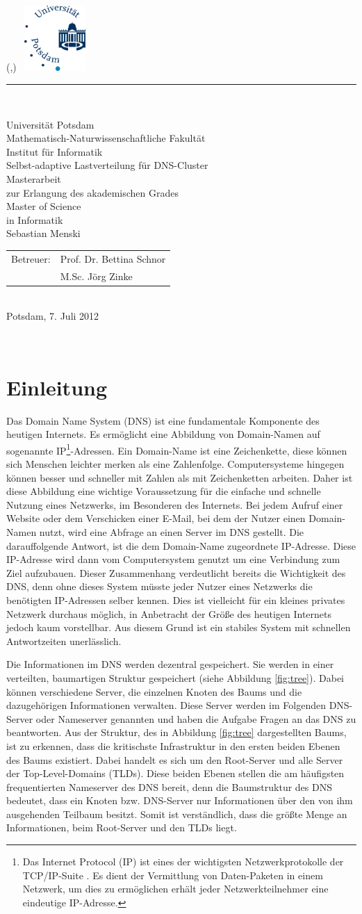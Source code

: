 \documentclass[a4paper, 12pt, BCOR10mm, DIV12, toc=bibliography, toc=listof, german]{scrbook}
\newlength{\TitleMargin}
\newlength{\TitleWidth}
\newcommand{\TitleUni}{Universität Potsdam}
\newcommand{\TitleInstitut}{Mathematisch-Naturwissenschaftliche Fakultät\\Institut für Informatik}
\newcommand{\TitleTitel}{Selbst-adaptive Lastverteilung für DNS-Cluster}
\newcommand{\TitleTyp}{Masterarbeit}
\newcommand{\TitleAutor}{Sebastian Menski}
\newcommand{\TitleBetreuerText}{Betreuer}
\newcommand{\TitleBetreuer}{Prof. Dr. Bettina Schnor\\ &M.Sc. Jörg Zinke}
\newcommand{\TitleAbschlussText}{zur Erlangung des akademischen Grades\\Master of Science\\in Informatik}
\newcommand{\TitleOrt}{Potsdam}
\newcommand{\TitleDatum}{7. Juli 2012}
\renewcommand{\maketitle}{
	\thispagestyle{empty}
	\begin{textblock*}{\TitleWidth}(\TitleMargin,\TitleMargin)
		~\hfill\includegraphics[height=2.5cm]{images/uni-logo}\\[3mm]
		{\color{uniblue}\rule{\TitleWidth}{1mm}}\\[5mm]
		{
			\centering
			\sffamily\Large
			{\LARGE\TitleUni}\\[0.5\baselineskip]
			{\large\TitleInstitut}\\[5\baselineskip]
			{\Huge\TitleTitel}\\[3\baselineskip]

			{\TitleTyp}\\
			\TitleAbschlussText\\[3\baselineskip]

			\TitleAutor\\[3\baselineskip]
			\begin{tabular}{rl}
				\TitleBetreuerText: & \TitleBetreuer
			\end{tabular}\\[2\baselineskip]
			\TitleOrt, \TitleDatum\par
		}
	\end{textblock*}
	~\clearpage
}
\def \dns {Domain Name System (DNS)}
\begin{document}
	\frontmatter
	\maketitle{}
	\tableofcontents{}

	\onehalfspacing{}
	\mainmatter
	\pagestyle{scrheadings}

	\chapter{Einleitung} %
	\label{cha:einleitung}

		Das \dns{} \cite{rfc1034, rfc1035} ist eine fundamentale Komponente des heutigen Internets.  Es
		ermöglicht eine Abbildung von Domain-Namen auf sogenannte IP\footnote{Das Internet Protocol (IP)
		\cite{rfc791} ist eines der wichtigsten Netzwerkprotokolle der TCP/IP-Suite
		\cite{stevens1994}. Es dient der Vermittlung von Daten-Paketen in einem Netzwerk, um dies zu
		ermöglichen erhält jeder Netzwerkteilnehmer eine eindeutige IP-Adresse.}-Adressen. Ein
		Domain-Name ist eine Zeichenkette, diese können sich Menschen leichter merken als eine
		Zahlenfolge.  Computersysteme hingegen können besser und schneller mit Zahlen als mit
		Zeichenketten arbeiten.  Daher ist diese Abbildung eine wichtige Voraussetzung für die einfache
		und schnelle Nutzung eines Netzwerks, im Besonderen des Internets. Bei jedem Aufruf einer
		Website oder dem Verschicken einer E-Mail, bei dem der Nutzer einen Domain-Namen nutzt, wird
		eine Abfrage an einen Server im DNS gestellt. Die darauffolgende Antwort, ist die dem
		Domain-Name zugeordnete IP-Adresse. Diese IP-Adresse wird dann vom Computersystem genutzt um
		eine Verbindung zum Ziel aufzubauen. Dieser Zusammenhang verdeutlicht bereits die Wichtigkeit
		des DNS, denn ohne dieses System müsste jeder Nutzer eines Netzwerks die benötigten IP-Adressen
		selber kennen. Dies ist vielleicht für ein kleines privates Netzwerk durchaus möglich, in
		Anbetracht der Größe des heutigen Internets jedoch	kaum vorstellbar. Aus diesem Grund ist ein
		stabiles System mit schnellen Antwortzeiten unerlässlich.

		Die Informationen im DNS werden dezentral gespeichert. Sie werden in einer verteilten,
		baumartigen Struktur gespeichert (siehe Abbildung \ref{fig:tree}). Dabei können verschiedene
		Server, die einzelnen Knoten des Baums und die dazugehörigen Informationen verwalten. Diese
		Server werden im Folgenden DNS-Server oder Nameserver genannten und haben die Aufgabe Fragen an
		das DNS zu beantworten. Aus der Struktur, des in Abbildung \ref{fig:tree} dargestellten Baums, ist
		zu erkennen, dass die kritischste Infrastruktur in den ersten beiden Ebenen des Baums existiert.
		Dabei handelt es sich um den Root-Server und alle Server der Top-Level-Domains (TLDs). Diese
		beiden Ebenen stellen die am häufigsten frequentierten Nameserver des DNS bereit, denn die Baumstruktur
		des DNS bedeutet, dass ein Knoten bzw. DNS-Server nur Informationen über den von ihm ausgehenden
		Teilbaum besitzt. Somit ist verständlich, dass die größte Menge an Informationen, beim Root-Server
		und den TLDs liegt.
\end{document}
